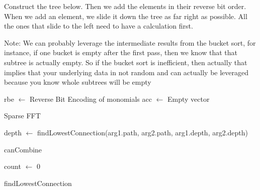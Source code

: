 Construct the tree below.
Then we add the elements in their reverse bit order. When we add an element, we slide it down the tree as far right as possible. All the ones that slide to the left need to have a calculation first.

Note: We can probably leverage the intermediate results from the bucket sort, for instance, if one bucket is empty after the first pass, then we know that that subtree is actually empty. So if the bucket sort is inefficient, then actually that implies that your underlying data in not random and can actually be leveraged because you know whole subtrees will be empty

\begin{algorithm}[H]
    \SetAlgoLined
    rbe $\gets$ Reverse Bit Encoding of monomials\;
    acc $\gets$ Empty vector\;
    \caption{Sparse FFT}
\end{algorithm}


\begin{algorithm}[H]
    \SetAlgoLined
    depth $\gets$ findLowestConnection(arg1.path, arg2.path, arg1.depth, arg2.depth)\;
    \;
    \caption{canCombine}
\end{algorithm}

\begin{algorithm}[H]
    \SetAlgoLined
    count $\gets$ 0\;
    \caption{findLowestConnection}
\end{algorithm}

